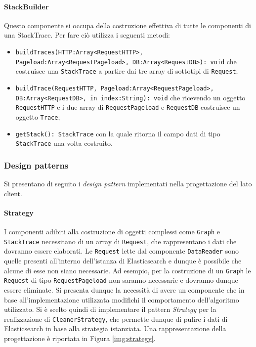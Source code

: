 \paragraph{StackBuilder} \Spazio
Questo componente si occupa della costruzione effettiva di tutte le componenti di una StackTrace. Per fare ciò utilizza i seguenti metodi:
\begin{itemize}
	\item \texttt{buildTraces(HTTP:Array<RequestHTTP>, Pageload:Array<RequestPageload>, DB:Array<RequestDB>): void} che costruisce una \texttt{StackTrace} a partire dai tre array di sottotipi di \texttt{Request};
	\item \texttt{buildTrace(RequestHTTP, Pageload:Array<RequestPageload>, DB:Array<RequestDB>, in index:String): void} che ricevendo un oggetto \texttt{RequestHTTP} e i due array di \texttt{RequestPageload} e \texttt{RequestDB} costruisce un oggetto \texttt{Trace};
	\item \texttt{getStack(): StackTrace} con la quale ritorna il campo dati di tipo \texttt{StackTrace} una volta costruito.
\end{itemize}




\subsubsection{Design patterns}
Si presentano di seguito i \emph{design pattern} implementati nella progettazione del lato client.

\paragraph{Strategy} \Spazio
\label{sec:patternStrategy}
I componenti adibiti alla costruzione di oggetti complessi come \texttt{Graph} e \texttt{StackTrace} necessitano di un array di \texttt{Request}, che rappresentano i dati che dovranno essere elaborati. Le \texttt{Request} lette dal componente \texttt{DataReader} sono quelle presenti all'interno dell'istanza di Elasticsearch e dunque è possibile che alcune di esse non siano necessarie. Ad esempio, per la costruzione di un \texttt{Graph} le \texttt{Request} di tipo \texttt{RequestPageload} non saranno necessarie e dovranno dunque essere eliminate. Si presenta dunque la necessità di avere un componente che in base all'implementazione utilizzata modifichi il comportamento dell'algoritmo utilizzato. Si è scelto quindi di implementare il pattern \emph{Strategy} per la realizzazione di \texttt{CleanerStrategy}, che permette dunque di pulire i dati di Elasticsearch in base alla strategia istanziata. Una rappresentazione della progettazione è riportata in Figura \ref{img:strategy}.

